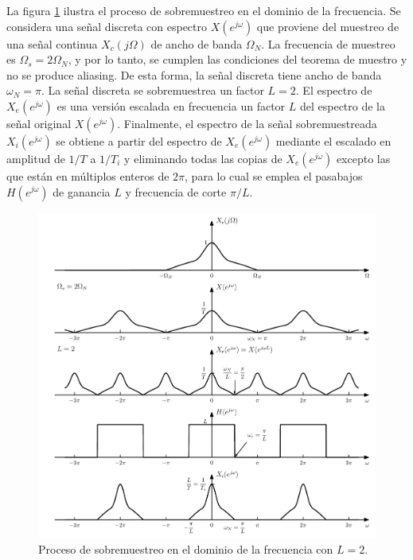 \documentclass[a4paper]{report}
\begin{document}
La figura \ref{fig:sampling_upsampling_freq_domain} ilustra el proceso de sobremuestreo en el dominio de la frecuencia. Se considera una señal discreta con espectro \(X(e^{j\omega})\) que proviene del muestreo de una señal continua \(X_c(j\Omega)\) de ancho de banda \(\Omega_N\). La frecuencia de muestreo es \(\Omega_s=2\Omega_N\), y por lo tanto, se cumplen las condiciones del teorema de muestro y no se produce aliasing. De esta forma, la señal discreta tiene ancho de banda \(\omega_N=\pi\). La señal discreta se sobremuestrea un factor \(L=2\). El espectro de \(X_e(e^{j\omega})\) es una versión escalada en frecuencia un factor \(L\) del espectro de la señal original \(X(e^{j\omega})\). Finalmente, el espectro de la señal sobremuestreada \(X_i(e^{j\omega})\) se obtiene a partir del espectro de \(X_e(e^{j\omega})\) mediante el escalado en amplitud de \(1/T\) a \(1/T_i\) y eliminando todas las copias de \(X_e(e^{j\omega})\) excepto las que están en múltiplos enteros de \(2\pi\), para lo cual se emplea el pasabajos \(H(e^{j\omega})\) de ganancia \(L\) y frecuencia de corte \(\pi/L\).
\begin{figure}[!htb]
 \begin{center}
 \includegraphics[width=1\textwidth]{figuras/sampling_upsampling_freq_domain.pdf}
 \caption{\label{fig:sampling_upsampling_freq_domain} Proceso de sobremuestreo en el dominio de la frecuencia con \(L=2\).}
 \end{center}
\end{figure}
\end{document}
